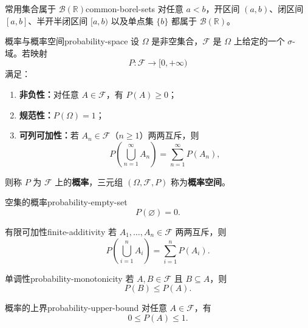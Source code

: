 \begin{proposition}{常用集合属于 $\mathscr{B}(\mathbb{R})$}{common-borel-sets}
对任意 $a<b$，开区间 $(a,b)$、闭区间 $[a,b]$、半开半闭区间 $[a,b)$ 以及单点集 $\{b\}$ 都属于 $\mathscr{B}(\mathbb{R})$。
\end{proposition}

\begin{mydefinition}{概率与概率空间}{probability-space}
设 $\Omega$ 是非空集合，$\mathscr{F}$ 是 $\Omega$ 上给定的一个 $\sigma$-域。若映射
\[
P:\mathscr{F}\longrightarrow[0,+\infty)
\]
满足：
\begin{enumerate}
\item \textbf{非负性：}对任意 $A\in\mathscr{F}$，有 $P(A)\geq0$；
\item \textbf{规范性：}$P(\Omega)=1$；
\item \textbf{可列可加性：}若 $A_n\in\mathscr{F}$（$n\geq1$）两两互斥，则
\[
P\left(\bigcup_{n=1}^{\infty}A_n\right)
=\sum_{n=1}^{\infty}P(A_n),
\]
\end{enumerate}
则称 $P$ 为 $\mathscr{F}$ 上的\textbf{概率}，三元组 $(\Omega,\mathscr{F},P)$ 称为\textbf{概率空间}。
\end{mydefinition}

\begin{proposition}{空集的概率}{probability-empty-set}
\[
P(\varnothing)=0.
\]
\end{proposition}

\begin{proposition}{有限可加性}{finite-additivity}
若 $A_1,\ldots,A_n\in\mathscr{F}$ 两两互斥，则
\[
P\left(\bigcup_{i=1}^{n}A_i\right)
=\sum_{i=1}^{n}P(A_i).
\]
\end{proposition}

\begin{proposition}{单调性}{probability-monotonicity}
若 $A,B\in\mathscr{F}$ 且 $B\subseteq A$，则
\[
P(B)\leq P(A).
\]
\end{proposition}

\begin{mycorollary}{概率的上界}{probability-upper-bound}
对任意 $A\in\mathscr{F}$，有
\[
0\leq P(A)\leq1.
\]
\end{mycorollary}

